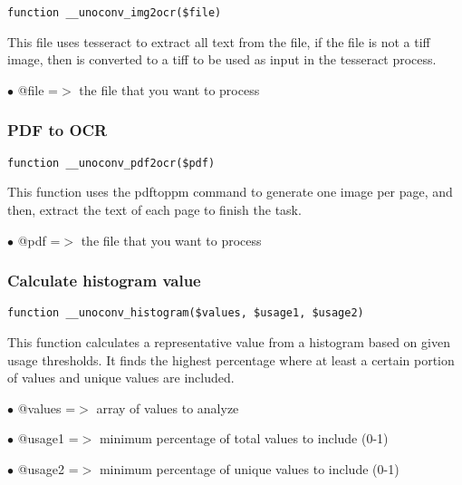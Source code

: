 \documentclass[a4paper]{article}
\begin{document}
\begin{lstlisting}
function __unoconv_img2ocr($file)
\end{lstlisting}

This file uses tesseract to extract all text from the file, if the file
is not a tiff image, then is converted to a tiff to be used as input in
the tesseract process.

\begin{compactitem}
\item[\color{myblue}$\bullet$] @file =$>$ the file that you want to process
\end{compactitem}

\hypertarget{toc540}{}
\subsubsection{PDF to OCR}

\begin{lstlisting}
function __unoconv_pdf2ocr($pdf)
\end{lstlisting}

This function uses the pdftoppm command to generate one image per page,
and then, extract the text of each page to finish the task.

\begin{compactitem}
\item[\color{myblue}$\bullet$] @pdf =$>$ the file that you want to process
\end{compactitem}

\hypertarget{toc541}{}
\subsubsection{Calculate histogram value}

\begin{lstlisting}
function __unoconv_histogram($values, $usage1, $usage2)
\end{lstlisting}

This function calculates a representative value from a histogram based on given usage thresholds.
It finds the highest percentage where at least a certain portion of values and unique values are included.

\begin{compactitem}
\item[\color{myblue}$\bullet$] @values =$>$ array of values to analyze
\item[\color{myblue}$\bullet$] @usage1 =$>$ minimum percentage of total values to include (0-1)
\item[\color{myblue}$\bullet$] @usage2 =$>$ minimum percentage of unique values to include (0-1)
\end{compactitem}
\end{document}
